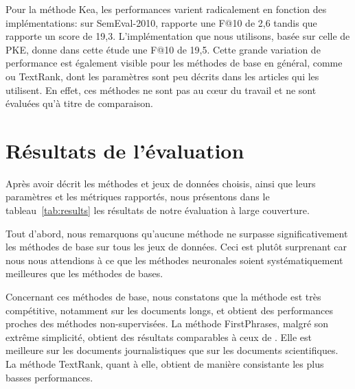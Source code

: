 
Pour la méthode Kea, les performances varient radicalement en fonction des implémentations: sur SemEval-2010, \citet{meng_deep_2017} rapporte une F@10 de 2,6 tandis que \citet{boudin_pke_2016} rapporte un score de 19,3.
L'implémentation que nous utilisons, basée sur celle de PKE, donne dans cette étude une F@10 de 19,5.
Cette grande variation de performance est également visible pour les méthodes de base en général, comme \tfidf{} ou TextRank, dont les paramètres sont peu décrits dans les articles qui les utilisent.
En effet, ces méthodes ne sont pas au c\oe{}ur du travail et ne sont évaluées qu'à titre de comparaison.




\section{Résultats de l'évaluation}
\label{sec:large_eval_results}



Après avoir décrit les méthodes et jeux de données choisis, ainsi que leurs paramètres et les métriques rapportés, nous présentons dans le tableau~\ref{tab:results} les résultats de notre évaluation à large couverture.

Tout d'abord, nous remarquons qu'aucune méthode ne surpasse significativement les méthodes de base sur tous les jeux de données.
Ceci est plutôt surprenant car nous nous attendions à ce que les méthodes neuronales soient systématiquement meilleures que les méthodes de bases.

Concernant ces méthodes de base, nous constatons que la méthode \tfidf{} est très compétitive, notamment sur les documents longs, et obtient des performances proches des méthodes non-supervisées.
La méthode FirstPhrases, malgré son extrême simplicité, obtient des résultats comparables à ceux de \tfidf{}. Elle est meilleure sur les documents journalistiques que sur les documents scientifiques.
La méthode TextRank, quant à elle, obtient de manière consistante les plus basses performances.

